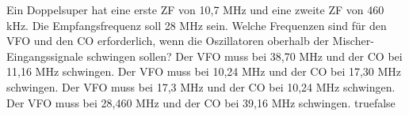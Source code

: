     {Ein Doppelsuper hat eine erste ZF von 10,7 MHz und eine zweite ZF von 460 kHz. Die Empfangsfrequenz soll 28 MHz sein. Welche Frequenzen sind für den VFO und den CO erforderlich, wenn die Oszillatoren oberhalb der Mischer-Eingangssignale schwingen sollen?}
    {Der VFO muss bei 38,70 MHz und der CO bei 11,16 MHz schwingen.}
    {Der VFO muss bei 10,24 MHz und der CO bei 17,30 MHz schwingen.}
    {Der VFO muss bei 17,3 MHz und der CO bei 10,24 MHz schwingen.}
    {Der VFO muss bei 28,460 MHz und der CO bei 39,16 MHz schwingen.}
    {true}{false}